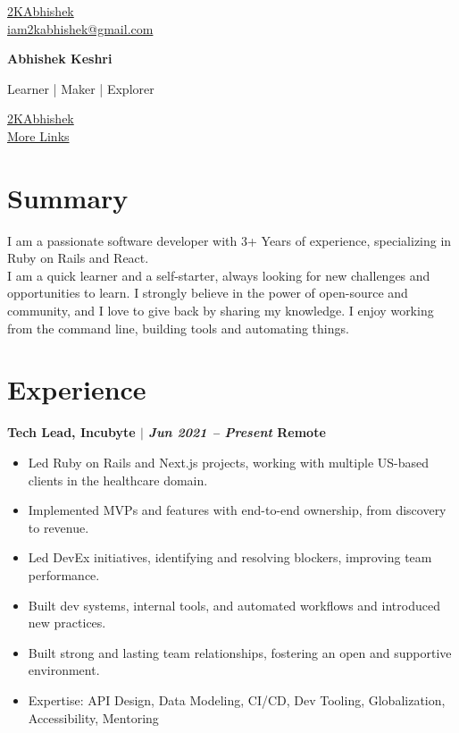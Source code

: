 \documentclass[11pt]{article} %
\newcommand{\uthree}[4]{
    {\large
        {\bfseries #1 $|$ \textit{#2} \hfill #3} \par
    }
    \begin{itemize}
        #4
    \end{itemize}
    \par\addvspace{2.5ex}%
}
\begin{document}
\begin{multicols}{3}
  \begin{flushleft}
    \color{gray}{\faGithub} \href{https://github.com/2kabhishek}{2KAbhishek} \\
    \color{gray}{\faEnvelope} \href{mailto:iam2kabhishek@gmail.com}{iam2kabhishek@gmail.com} \\
  \end{flushleft}

\columnbreak

  \begin{center}
      {\huge\bfseries Abhishek Keshri} \par
      Learner | Maker | Explorer \par
  \end{center}

\columnbreak

  \begin{flushright}
    \href{https://linkedin.com/in/2kabhishek/}{2KAbhishek} {\color{gray}{\faLinkedin}} \\
    \href{https://2kabhishek.github.io/links}{More Links} {\textcolor{gray}{\faLink}} \\
  \end{flushright}
\end{multicols}

\section{Summary}
I am a passionate software developer with 3+ Years of experience, specializing in Ruby on Rails and React. \\
I am a quick learner and a self-starter, always looking for new challenges and opportunities to learn.
I strongly believe in the power of open-source and community, and I love to give back by sharing my knowledge.
I enjoy working from the command line, building tools and automating things.

\section{Experience}
\uthree{Tech Lead, Incubyte}{Jun 2021 -- Present}{Remote}{
  \item Led Ruby on Rails and Next.js projects, working with multiple US-based clients in the healthcare domain.
  \item Implemented  MVPs and features with end-to-end ownership, from discovery to revenue.
  \item Led DevEx initiatives, identifying and resolving blockers, improving team performance.
  \item Built dev systems, internal tools, and automated workflows and introduced new practices.
  \item Built strong and lasting team relationships, fostering an open and supportive environment.
  \item Expertise: API Design, Data Modeling, CI/CD, Dev Tooling, Globalization, Accessibility, Mentoring
}
\end{document}
